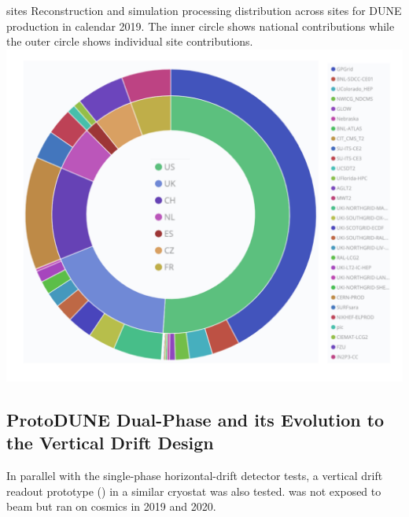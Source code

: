 \documentclass[../main-v1.tex]{subfiles}
\begin{document}
\begin{dunefigure}
{sites} %
{Reconstruction and simulation processing distribution across sites for DUNE production in calendar 2019.  The inner circle shows national contributions while the outer circle shows individual site contributions.}
\includegraphics[height=0.65\textwidth]{graphics/IntroFigures/Fig_8.pdf}
\end{dunefigure}

\subsection{ProtoDUNE Dual-Phase and its Evolution to the Vertical Drift Design }


In parallel with the single-phase horizontal-drift detector tests, a vertical drift   readout prototype ()
in a similar cryostat was also  tested.   was not exposed to beam but ran on cosmics in 2019 and 2020. 
\end{document}
